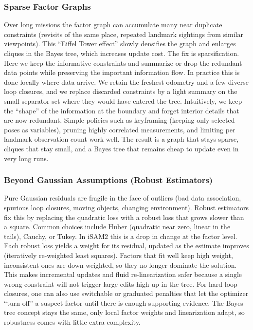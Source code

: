 


\subsubsection{Sparse Factor Graphs}
Over long missions the factor graph can accumulate many near duplicate constraints (revisits of the same place, repeated landmark sightings from similar viewpoints). This “Eiffel Tower effect” slowly densifies the graph and enlarges cliques in the Bayes tree, which increases update cost. The fix is sparsification. Here we keep the informative constraints and summarize or drop the redundant data points while preserving the important information flow. In practice this is done locally where data arrive. We retain the freshest odometry and a few diverse loop closures, and we replace discarded constraints by a light summary on the small separator set where they would have entered the tree. Intuitively, we keep the ``shape'' of the information at the boundary and forget interior details that are now redundant. Simple policies such as keyframing (keeping only selected poses as variables), pruning highly correlated measurements, and limiting per landmark observation count work well. The result is a graph that stays sparse, cliques that stay small, and a Bayes tree that remains cheap to update even in very long runs.



\subsubsection{Beyond Gaussian Assumptions (Robust Estimators)}
Pure Gaussian residuals are fragile in the face of outliers (bad data association, spurious loop closures, moving objects, changing environment). Robust estimators fix this by replacing the quadratic loss with a robust loss that grows slower than a square. Common choices include Huber (quadratic near zero, linear in the tails), Cauchy, or Tukey. In \gls{iSAM}2 this is a drop in change at the factor level. Each robust loss yields a weight for its residual, updated as the estimate improves (iteratively re-weighted least squares). Factors that fit well keep high weight, inconsistent ones are down weighted, so they no longer dominate the solution. This makes incremental updates and fluid re-linearization safer because a single wrong constraint will not trigger large edits high up in the tree. For hard loop closures, one can also use switchable or graduated penalties that let the optimizer ``turn off'' a suspect factor until there is enough supporting evidence. The Bayes tree concept stays the same, only local factor weights and linearization adapt, so robustness comes with little extra complexity.



